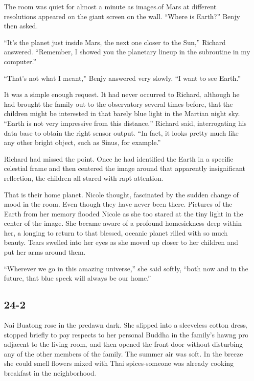 \documentclass[]{article}
\begin{document}
{The room was quiet for almost a minute as images.of Mars at different resolutions appeared on the giant screen on the wall. “Where is Earth?” Benjy then asked.

“It’s the planet just inside Mars, the next one closer to the Sun,” Richard answered. “Remember, I showed you the planetary lineup in the subroutine in my computer.”

“That’s not what I meant,” Benjy answered very slowly. “I want to see Earth.”

It was a simple enough request. It had never occurred to Richard, although he had brought the family out to the observatory several times before, that the children might be interested in that barely blue light in the Martian night sky. “Earth is not very impressive from this distance,” Richard said, interrogating his data base to obtain the right sensor output. “In fact, it looks pretty much like any other bright object, such as Sinus, for example.”

Richard had missed the point. Once he had identified the Earth in a specific celestial frame and then centered the image around that apparently insignificant reflection, the children all stared with rapt attention.

That is their home planet. Nicole thought, fascinated by the sudden change of mood in the room. Even though they have never been there. Pictures of the Earth from her memory flooded Nicole as she too stared at the tiny light in the center of the image. She became aware of a profound homesickness deep within her, a longing to return to that blessed, oceanic planet rilled with so much beauty. Tears swelled into her eyes as she moved up closer to her children and put her arms around them.

“Wherever we go in this amazing universe,” she said softly, “both now and in the future, that blue speck will always be our home.”


\subsection{24-2}

Nai Buatong rose in the predawn dark. She slipped into a sleeveless cotton dress, stopped briefly to pay respects to her personal Buddha in the family’s hawng pro adjacent to the living room, and then opened the front door without disturbing any of the other members of the family. The summer air was soft. In the breeze she could smell flowers mixed with Thai spices-someone was already cooking breakfast in the neighborhood.

}
\end{document}
